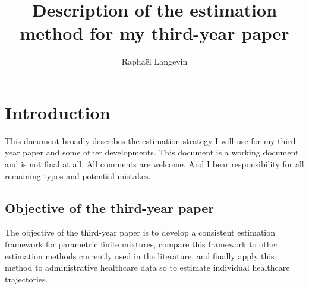 \documentclass[11pt,letter]{article}
\begin{document}
\pagestyle{fancy}

\title{Description of the estimation method for my third-year paper}
\author{Raphaël Langevin}


\maketitle

\section{Introduction}
This document broadly describes the estimation strategy I will use for my third-year paper and some other developments. This document is a working document and is not final at all. All comments are welcome. And I bear responsibility for all remaining typos and potential mistakes.
\subsection{Objective of the third-year paper}
The objective of the third-year paper is to develop a consistent estimation framework for parametric finite mixtures, compare this framework to other estimation methods currently used in the literature, and finally apply this method to administrative healthcare data so to estimate individual healthcare trajectories.
\end{document}

